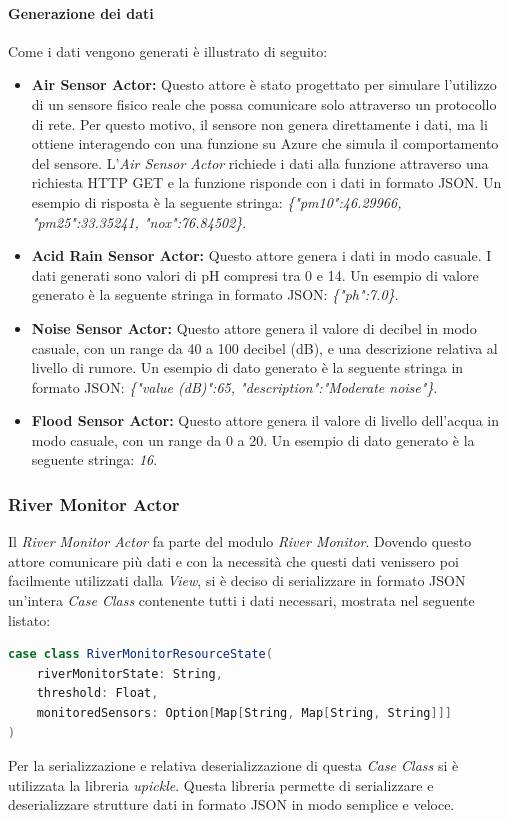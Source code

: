 \documentclass{scrartcl}
\begin{document}
\paragraph{Generazione dei dati}
Come i dati vengono generati è illustrato di seguito:
\begin{itemize}
    \item \textbf{Air Sensor Actor:} Questo attore è stato progettato per simulare l'utilizzo di un sensore fisico reale che possa comunicare solo attraverso un protocollo di rete. Per questo motivo, il sensore non genera direttamente i dati, ma li ottiene interagendo con una funzione su Azure che simula il comportamento del sensore. L'\textit{Air Sensor Actor} richiede i dati alla funzione attraverso una richiesta HTTP GET e la funzione risponde con i dati in formato JSON. Un esempio di risposta è la seguente stringa: \textit{\{"pm10":46.29966, "pm25":33.35241, "nox":76.84502\}}.
    \item \textbf{Acid Rain Sensor Actor:} Questo attore genera i dati in modo casuale. I dati generati sono valori di pH compresi tra 0 e 14. Un esempio di valore generato è la seguente stringa in formato JSON: \textit{\{"ph":7.0\}}.
    \item \textbf{Noise Sensor Actor:} Questo attore genera il valore di decibel in modo casuale, con un range da 40 a 100 decibel (dB), e una descrizione relativa al livello di rumore. Un esempio di dato generato è la seguente stringa in formato JSON: \textit{\{"value (dB)":65, "description":"Moderate noise"\}}.
    \item \textbf{Flood Sensor Actor:} Questo attore genera il valore di livello dell'acqua in modo casuale, con un range da 0 a 20. Un esempio di dato generato è la seguente stringa: \textit{16}.
\end{itemize}

\subsubsection{River Monitor Actor}
Il \textit{River Monitor Actor} fa parte del modulo \textit{River Monitor}. Dovendo questo attore comunicare più dati e con la necessità che questi dati venissero poi facilmente utilizzati dalla \textit{View}, si è deciso di serializzare in formato JSON un'intera \textit{Case Class} contenente tutti i dati necessari, mostrata nel seguente listato:
\begin{lstlisting}[language=Scala]
case class RiverMonitorResourceState(
    riverMonitorState: String,
    threshold: Float,
    monitoredSensors: Option[Map[String, Map[String, String]]]
)
\end{lstlisting}
Per la serializzazione e relativa deserializzazione di questa \textit{Case Class} si è utilizzata la libreria \textit{upickle}\cite{upickle}. Questa libreria permette di serializzare e deserializzare strutture dati in formato JSON in modo semplice e veloce.
\end{document}
